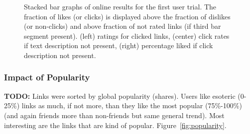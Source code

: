 \begin{figure}[t!]
\caption{Stacked bar graphs of online results for the first 
user trial.  The fraction of likes (or clicks) is displayed above 
the fraction of dislikes (or non-clicks) and above fraction of not rated
links (if third bar segment present).  
(left) ratings for clicked links, (center) click rates if
text description not present, 
(right) percentage liked if click description not present.}
\label{fig:click_evidence}
\end{figure}

\subsubsection{Impact of Popularity}

{\bf TODO:} Links were sorted by global popularity (shares).
Users like esoteric (0-25\%) links as much, if not
more, than they like the most popular (75\%-100\%) (and again friends
more than non-friends but same general trend).  Most interesting
are the links that are kind of popular.
Figure~\ref{fig:popularity}.

